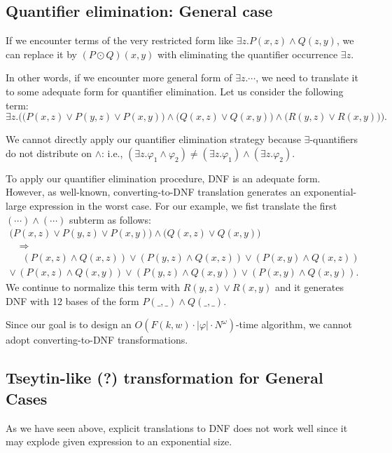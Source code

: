 \subsection{Quantifier elimination: General case}

If we encounter terms of the very restricted form like $\exists z. P(x, z) \land Q(z, y)$,
we can replace it by $(P \odot Q)(x, y)$ with eliminating the quantifier occurrence $\exists z$.

In other words, if we encounter more general form of $\exists z. \cdots$, we need to translate it to some adequate form for quantifier elimination.
%
Let us consider the following term:
$$
\exists z. \biggl(
\bigl(P(x, z) \lor P(y, z) \lor P(x, y) \bigr)
\land
\bigl(Q(x, z) \lor Q(x, y)\bigr)
\land
\bigl(R(y, z) \lor R(x, y)\bigr)
\biggr).
$$

We cannot directly apply our quantifier elimination strategy because $\exists$-quantifiers do not distribute on $\land$: i.e.,
$(\exists z. \varphi_1 \land \varphi_2) \neq (\exists z. \varphi_1) \land (\exists z. \varphi_2)$.

To apply our quantifier elimination procedure, DNF is an adequate form.
However, as well-known, converting-to-DNF translation generates an exponential-large expression in the worst case.
For our example, we fist translate the first $(\cdots) \land (\cdots)$ subterm as follows:
$$
\begin{array}{l}
\bigl(P(x, z) \lor P(y, z) \lor P(x, y) \bigr)
\land
\bigl(Q(x, z) \lor Q(x, y)\bigr) \\
\quad \Rightarrow \\
\phantom{\lor}\,
(P(x, z) \land Q(x,z)) \lor
(P(y, z) \land Q(x,z)) \lor
(P(x, y) \land Q(x, z)) \\
\lor\,
(P(x, z) \land Q(x, y)) \lor
(P(y, z) \land Q(x, y)) \lor
(P(x, y) \land Q(x, y)).
\end{array}
$$
We continue to normalize this term with $R(y, z) \lor R(x, y)$
and it generates DNF with 12 bases of the form $P(\_, \_) \land Q(\_, \_)$.

Since our goal is to design an $O(F(k, w) \cdot |\varphi| \cdot N^{\omega})$-time algorithm, we cannot adopt converting-to-DNF transformations.


\subsection{Tseytin-like (?) transformation for General Cases}

As we have seen above, explicit translations to DNF does not work well since it may explode given expression to an exponential size.

